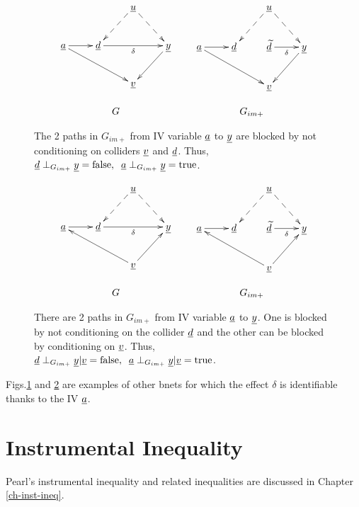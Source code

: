 \begin{figure}[h!]
$$
\begin{array}{ccc}
\xymatrix{
&&\rvu\ar@{-->}[dl]\ar@{-->}[dr]
\\
\rva\ar[r]\ar[drr]
&\rvd\ar[rr]_\delta
&&\rvy\ar[dl]
\\
&&\rvv
}
&&
\xymatrix{
&&\rvu\ar@{-->}[dl]\ar@{-->}[dr]
\\
\rva\ar[r]\ar[drr]
&\rvd&
\rvtd\ar[r]_\delta
&\rvy\ar[dl]
\\
&&\rvv
}
\\
\\
G&&G_{im+}
\end{array}
$$
\caption{The 2 paths in $G_{im+}$
from
IV variable $\rva$
to $\rvy$ are blocked by
not conditioning on colliders $\rvv$
and $\rvd$. Thus,
$
\rvd\perp_{G_{im+}} \rvy =\text{false}, 
\;\; \rva\perp_{G_{im+}} \rvy= \text{true}
$.
}
\label{fig-iv-G-im-blocked}
\end{figure}




\begin{figure}[h!]
$$
\begin{array}{ccc}
\xymatrix{
&&\rvu\ar@{-->}[dl]\ar@{-->}[dr]
\\
\rva\ar[r]
&\rvd\ar[rr]_\delta
&&\rvy
\\
&&\rvv\ar[ur]\ar[ull]
}
&&
\xymatrix{
&&\rvu\ar@{-->}[dl]\ar@{-->}[dr]
\\
\rva\ar[r]
&\rvd
&
\rvtd\ar[r]_\delta
&\rvy
\\
&&\rvv\ar[ur]\ar[ull]
}
\\
\\
G&&G_{im+}
\end{array}
$$
\caption{
There are 2 paths in $G_{im+}$
from
IV variable $\rva$
to $\rvy$. One is
blocked
by not conditioning on the collider $\rvd$
and the other
can be blocked by 
conditioning on $\rvv$. Thus,
$
\rvd\perp_{G_{im+}} \rvy|\rvv =\text{false}, 
\;\; \rva\perp_{G_{im+}} \rvy|\rvv= \text{true}
$.
}
\label{fig-iv-G-im-strata}
\end{figure}

Figs.\ref{fig-iv-G-im-blocked}
and \ref{fig-iv-G-im-strata}
are examples of 
other bnets 
for which the
effect $\delta$
is identifiable
thanks
to the
IV $\rva$.


\section{Instrumental Inequality}
Pearl's instrumental inequality
and related inequalities are discussed in
 Chapter
 \ref{ch-inst-ineq}.


